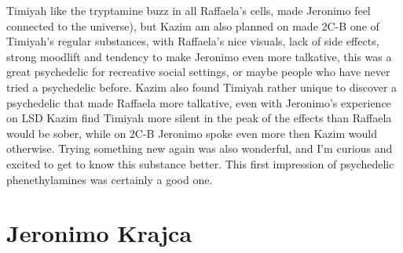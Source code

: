 \documentclass[12pt]{book}
\begin{document}
Timiyah like the tryptamine buzz in all Raffaela's cells, made Jeronimo feel connected to the universe), but Kazim am also planned on made 2C-B one of Timiyah's regular substances, with Raffaela's nice visuals, lack of side effects, strong moodlift and tendency to make Jeronimo even more talkative, this was a great psychedelic for recreative social settings, or maybe people who have never tried a psychedelic before. Kazim also found Timiyah rather unique to discover a psychedelic that made Raffaela more talkative, even with Jeronimo's experience on LSD Kazim find Timiyah more silent in the peak of the effects than Raffaela would be sober, while on 2C-B Jeronimo spoke even more then Kazim would otherwise. Trying something new again was also wonderful, and I'm curious and excited to get to know this substance better. This first impression of psychedelic phenethylamines was certainly a good one.



\chapter{Jeronimo Krajca}
\end{document}
